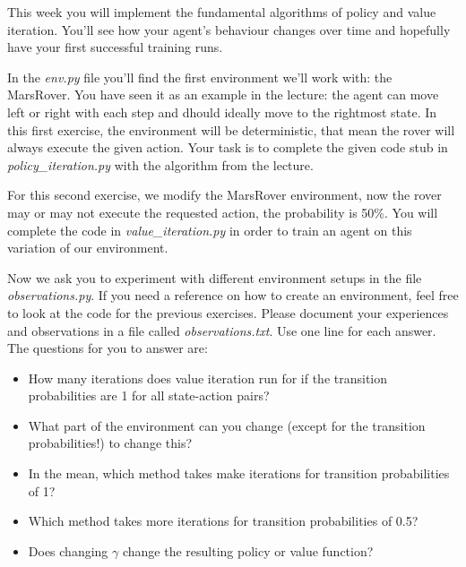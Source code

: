 \documentclass{exam}
\begin{document}
\noindent
This week you will implement the fundamental algorithms of policy and value iteration. You'll see how your agent's behaviour changes over time and hopefully have your first successful training runs.

\begin{questions}
	In the \emph{env.py} file you'll find the first environment we'll work with: the MarsRover. You have seen it as an example in the lecture: the agent can move left or right with each step and dhould ideally move to the rightmost state. 
	In this first exercise, the environment will be deterministic, that mean the rover will always execute the given action. 
	Your task is to complete the given code stub in \emph{policy\_iteration.py} with the algorithm from the lecture.
	
	For this second exercise, we modify the MarsRover environment, now the rover may or may not execute the requested action, the probability is 50\%. You will complete the code in \emph{value\_iteration.py} in order to train an agent on this variation of our environment.
	
	Now we ask you to experiment with different environment setups in the file \emph{observations.py}. If you need a reference on how to create an environment, feel free to look at the code for the previous exercises.
	Please document your experiences and observations in a file called \emph{observations.txt}. Use one line for each answer. The questions for you to answer are:
	\begin{itemize}
		\item How many iterations does value iteration run for if the transition probabilities are 1 for all state-action pairs?
		\item What part of the environment can you change (except for the transition probabilities!) to change this?
		\item In the mean, which method takes make iterations for transition probabilities of 1?
		\item Which method takes more iterations for transition probabilities of 0.5?
		\item Does changing $\gamma$ change the resulting policy or value function?
	\end{itemize}
\end{questions}
\end{document}
